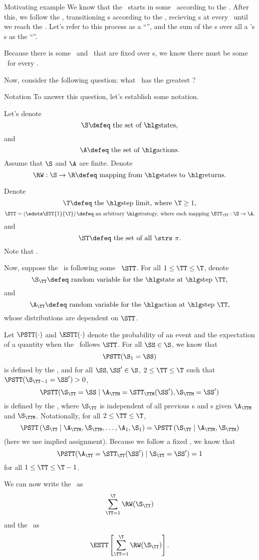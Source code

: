 \documentclass{rl_theory}
\begin{document}
\begin{part} {Motivating example}
  We know that the \agt\ starts in some \til\ according to the \ind.
  After this, we follow the \str, 
  transitioning \til{}s according to the \trd, recieving \rwd{}s 
  at every \til\ until
  we reach the \lmt. Let's refer to this process as a ``\run'', and
  the sum of the \rwd{}s over all a \run's \til{}s
  as the ``\trwd''.

  Because there is some \ind\ and \trd\ 
  that are fixed over \run{}s, 
  we know there must be 
  some \atrwd\ for every \str.

  Now, consider the following question: 
  what \str\ has the greatest \atrwd?
\end{part}

\newpage
\begin{part}{Notation}
  To answer this question, let's establish some notation.

  Let's denote
  $$\text{$\S \defeq$ the set of \til{}s},$$
  and 
  $$\text{$\A \defeq$ the set of \act{}s.}$$
  Assume that $\S$ and $\A$ are finite.
  Denote
  $$\text{$\RW : \S \rightarrow \R \defeq$ mapping from \til{}s to \rwd{}s.}$$

  Denote
  $$\text{$\T \defeq$ the \lmt, where $\T \ge 1$},$$
  $$\text{$\STT = \left(\edots\STT{1}{\T}\right) \defeq$ an arbitrary \str, 
  where each mapping $\STT_\TT : \S \rightarrow \A$},$$
  and
  $$\text{$\ST \defeq$ the set of all \strs\ $\pi$}.$$
  Note that .

  Now, suppose the \agt\ is following some \str\ $\STT$.
  For all $1 \le \TT \le \T$,
  denote
  $$\text{$\S_\TT \defeq$ random variable for the \til\ at \stp\ $\TT$},$$
  and
  $$\text{$\A_\TT \defeq$ random variable for the \act\ at \stp\ $\TT$},$$
  whose distributions are dependent on $\STT$.

  Let $\PSTT(\cdot)$ and $\ESTT(\cdot)$ denote the probability of an event
  and the expectation of a quantity
  when the \agt\ follows $\STT$.
  For all $\SS \in \S$, we know that
  $$\PSTT(\S_1 = \SS)$$
  is defined by the \ind, and
  for all $\SS, \SS' \in \S$, $2 \le \TT \le \T$ such that 
  $\PSTT(\S_{\TT - 1} = \SS') > 0$,
  $$\PSTT(\S_\TT = \SS \mid \A_\TTM = \STT_\TTM(\SS'), \S_\TTM = \SS')$$
  is defined by the \trd, where 
  $\S_\TT$ is independent of all previous \til{}s and \act{}s given $\A_\TTM$ and $\S_\TTM$.
  Notationally, for all $2 \le \TT \le \T$,
  $$ 
  \PSTT\left( \S_\TT \mid \A_{\TTM}, \S_{\TTM}, \ldots, \A_{1}, \S_{1} \right)
  = 
  \PSTT\left( \S_\TT \mid \A_{\TTM}, \S_{\TTM}\right)
  $$
  (here we use implied assignment).
  Because we follow a fixed \str, we know that
  $$\PSTT(\A_\TT = \STT_\TT(\SS') \mid \S_\TT = \SS') = 1$$
  for all
  $1 \le \TT \le \T - 1$.

  We can now write the \trwd\ as
  $$\sum_{\TT = 1}^\T \RW(\S_\TT)$$
  and the \atrwd\ as
  $$\ESTT\left[\sum_{\TT = 1}^\T \RW(\S_\TT)\right].$$
\end{part}
\end{document}

